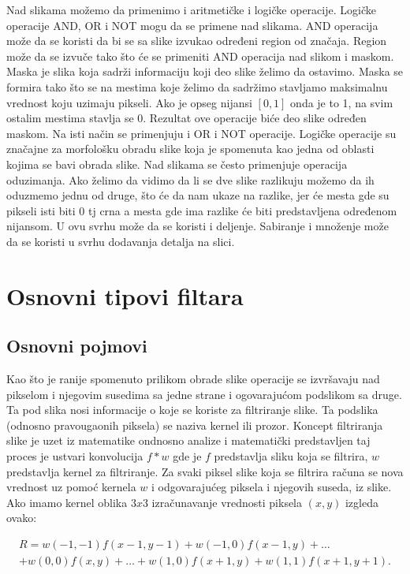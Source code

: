 \documentclass[a4paper,12pt,titlepage]{article}
\begin{document}
Nad slikama možemo da primenimo i aritmetičke i logičke operacije. Logičke operacije AND, OR i NOT mogu da se primene nad slikama. AND operacija može da se koristi da bi se sa slike izvukao određeni region od značaja. Region može da se izvuče tako što će se primeniti AND operacija nad slikom i maskom. Maska je slika koja sadrži informaciju koji deo slike želimo da ostavimo. Maska se formira tako što se na mestima koje želimo da sadržimo stavljamo maksimalnu vrednost koju uzimaju pikseli. Ako je opseg nijansi $[0, 1]$ onda je to 1, na svim ostalim mestima stavlja se 0. Rezultat ove operacije biće deo slike određen maskom. Na isti način se primenjuju i OR i NOT operacije. Logičke operacije su značajne za morfološku obradu slike koja je spomenuta kao jedna od oblasti kojima se bavi obrada slike. Nad slikama se često primenjuje operacija oduzimanja. Ako želimo da vidimo da li se dve slike razlikuju možemo da ih oduzmemo jednu od druge, što će da nam ukaze na razlike, jer će mesta gde su pikseli isti biti 0 tj crna a mesta gde ima razlike će biti predstavljena određenom nijansom. U ovu svrhu može da se koristi i deljenje. Sabiranje i množenje može da se koristi u svrhu dodavanja detalja na slici.

\section{Osnovni tipovi filtara}\label{3}%

\subsection{Osnovni pojmovi}%

Kao što je ranije spomenuto prilikom obrade slike operacije se izvršavaju nad pikselom i njegovim susedima sa jedne strane i ogovarajućom podslikom sa druge. Ta pod slika nosi informacije o koje se koriste za filtriranje slike. Ta podslika (odnosno pravougaonih piksela) se naziva kernel ili prozor. Koncept filtriranja slike je uzet iz matematike ondnosno analize i matematički predstavljen taj proces je ustvari konvolucija $f * w$ gde je $f$ predstavlja sliku koja se filtrira, $w$ predstavlja kernel za filtriranje. Za svaki piksel slike koja se filtrira računa se nova vrednost uz pomoć kernela $w$ i odgovarajućeg piksela i njegovih suseda, iz slike. Ako imamo kernel oblika $3 x 3$ izračunavanje vrednosti piksela $(x, y)$ izgleda ovako:

\begin{equation}\label{eq:conv1}
\begin{split}
R = w(-1, -1)f(x - 1, y - 1) + w(-1, 0)f(x - 1, y) + \dots \\
+ w(0, 0)f(x, y) + \dots + w(1, 0)f(x + 1, y) + w(1, 1)f(x + 1, y + 1).
\end{split}
\end{equation}
\end{document}
